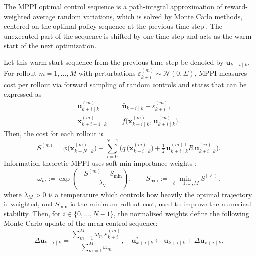 \documentclass[letterpaper, 10 pt, conference]{ieeeconf}
\begin{document}
The MPPI optimal control sequence is a path-integral approximation of reward-weighted average random variations, which is solved by Monte Carlo methods, centered on the optimal policy sequence at the previous time step \cite{williams2017model}. The unexecuted part of the sequence is shifted by one time step and acts as the warm start of the next optimization. 

Let this warm start sequence from the previous time step be denoted by $\bar{\mathbf{u}}_{k+i\mid k}$. For rollout $m=1,\dots,M$ with perturbations $\varepsilon^{(m)}_{k+i}\!\sim\!\mathcal{N}(0,\Sigma)$, MPPI measures cost per rollout via forward sampling of random controls and states that can be expressed as
\begin{subequations}
\begin{align}
\mathbf{u}^{(m)}_{k+i\mid k}&=\bar{\mathbf{u}}_{k+i\mid k}+\varepsilon^{(m)}_{k+i},\label{eq:mppi_rollout}\\
\mathbf{x}^{(m)}_{k+i+1\mid k}&=f\!\bigl(\mathbf{x}^{(m)}_{k+i\mid k},\,\mathbf{u}^{(m)}_{k+i\mid k}\bigr).
\end{align}
\end{subequations}
Then, the cost for each rollout is
\begin{equation}
S^{(m)}\!=\!\phi\bigl(\mathbf{x}^{(m)}_{k+N\mid k}\bigr)
+\sum_{i=0}^{N-1}\Big(q\,\!\bigl(\mathbf{x}^{(m)}_{k+i\mid k}\bigr)+\tfrac{1}{2}\,\mathbf{u}^{(m)\top}_{k+i\mid k} R\,\mathbf{u}^{(m)}_{k+i\mid k}\Big).
\label{eq:mppicost}
\end{equation}
Information-theoretic MPPI uses soft-min importance weights \cite{williams2017info}:
\begin{equation}
\omega_m:=\exp\!\left(-\frac{S^{(m)}-S_{\min}}{\lambda_{\mathrm M}}\right),\qquad S_{\min}:=\min_{\ell=1,\ldots,M}S^{(\ell)}.
\label{eq:mppi-weights}
\end{equation}
where $\lambda_M >0$ is a temperature which controls how heavily the optimal trajectory is weighted, and $S_\text{min}$ is the minimum rollout cost, used to improve the numerical stability. Then, for $i \in \{0, ..., N-1\}$, the normalized weights define the following Monte Carlo update of the mean control sequence:
\begin{equation}
\Delta \mathbf{u}_{k+i\mid k}=
\frac{\sum_{m=1}^{M}\omega_m\,\varepsilon^{(m)}_{k+i}}{\sum_{m=1}^{M}\omega_m},
\quad
\mathbf{u}^*_{k+i\mid k}\leftarrow \bar{\mathbf{u}}_{k+i\mid k}+\Delta \mathbf{u}_{k+i\mid k}. \label{eq:mppi-update}
\end{equation}
\end{document}
